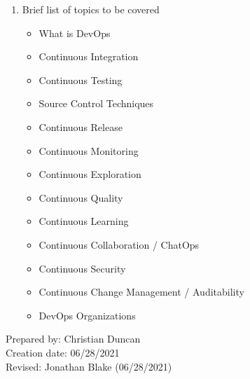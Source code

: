 \begin{enumerate}[1.]
\item Brief list of topics to be covered\\
  {\bfseries
    \begin{itemize}
      \item What is DevOps
      \item Continuous Integration
      \item Continuous Testing
      \item Source Control Techniques
      \item Continuous Release
      \item Continuous Monitoring
      \item Continuous Exploration
      \item Continuous Quality
      \item Continuous Learning
      \item Continuous Collaboration / ChatOps
      \item Continuous Security
      \item Continuous Change Management / Auditability
      \item DevOps Organizations
    \end{itemize}
  }

\end{enumerate}

\noindent Prepared by: Christian Duncan\\
\noindent Creation date: 06/28/2021\\
\noindent Revised: Jonathan Blake (06/28/2021)\\
